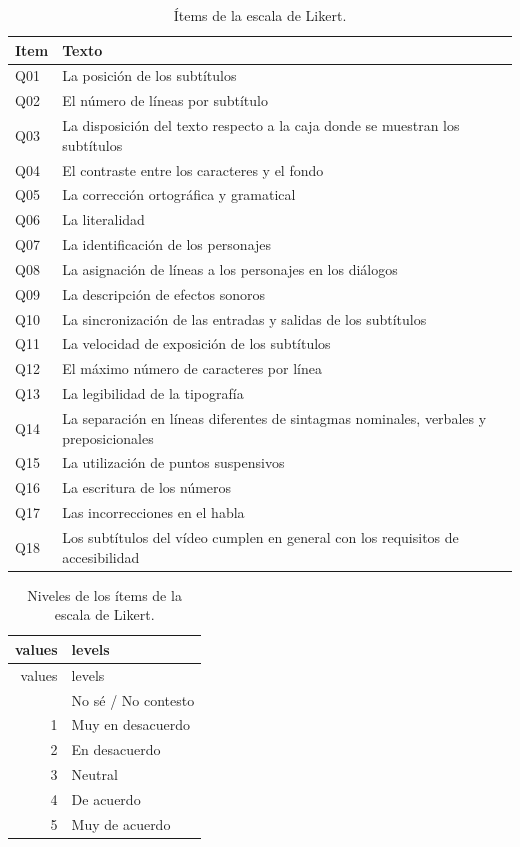 \documentclass[
  12pt,
  a4paper,
  extrafontsizes,
  onecolumn,
  openright,
  table]{memoir}
\begin{document}
\hypertarget{tbl-likert-scale}{}
\begin{longtable}{ll}
\caption{\label{tbl-likert-scale}Ítems de la escala de Likert. }\tabularnewline

\toprule
Item & Texto \\ 
\midrule
Q01 & La posición de los subtítulos \\ 
Q02 & El número de líneas por subtítulo \\ 
Q03 & La disposición del texto respecto a la caja donde se muestran los subtítulos \\ 
Q04 & El contraste entre los caracteres y el fondo \\ 
Q05 & La corrección ortográfica y gramatical \\ 
Q06 & La literalidad \\ 
Q07 & La identificación de los personajes \\ 
Q08 & La asignación de líneas a los personajes en los diálogos \\ 
Q09 & La descripción de efectos sonoros \\ 
Q10 & La sincronización de las entradas y salidas de los subtítulos \\ 
Q11 & La velocidad de exposición de los subtítulos \\ 
Q12 & El máximo número de caracteres por línea \\ 
Q13 & La legibilidad de la tipografía \\ 
Q14 & La separación en líneas diferentes de sintagmas nominales, verbales y preposicionales \\ 
Q15 & La utilización de puntos suspensivos \\ 
Q16 & La escritura de los números \\ 
Q17 & Las incorrecciones en el habla \\ 
Q18 & Los subtítulos del vídeo cumplen en general con los requisitos de accesibilidad \\ 
\bottomrule
\end{longtable}

\hypertarget{tbl-likert-levels}{}
\begin{longtable}[]{@{}rl@{}}
\caption{\label{tbl-likert-levels}Niveles de los ítems de la escala de
Likert.}\tabularnewline
\toprule\noalign{}
values & levels \\
\midrule\noalign{}
\endfirsthead
\toprule\noalign{}
values & levels \\
\midrule\noalign{}
\endhead
\bottomrule\noalign{}
\endlastfoot
0 & No sé / No contesto \\
1 & Muy en desacuerdo \\
2 & En desacuerdo \\
3 & Neutral \\
4 & De acuerdo \\
5 & Muy de acuerdo \\
\end{longtable}
\end{document}
